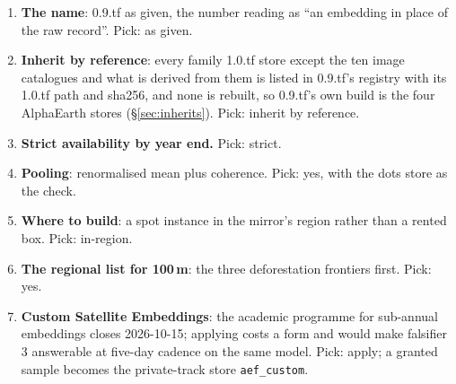 \documentclass[10pt]{article}
\newcommand{\code}[1]{\texttt{#1}}
\begin{document}
\begin{enumerate}\itemsep2pt
\item \textbf{The name}: 0.9.tf as given, the number reading as ``an
embedding in place of the raw record''. Pick: as given.
\item \textbf{Inherit by reference}: every family 1.0.tf store except the
ten image catalogues and what is derived from them is listed in 0.9.tf's
registry with its 1.0.tf path and sha256, and none is rebuilt, so 0.9.tf's
own build is the four AlphaEarth stores (\S\ref{sec:inherits}). Pick:
inherit by reference.
\item \textbf{Strict availability by year end.} Pick: strict.
\item \textbf{Pooling}: renormalised mean plus coherence. Pick: yes, with
the dots store as the check.
\item \textbf{Where to build}: a spot instance in the mirror's region
rather than a rented box. Pick: in-region.
\item \textbf{The regional list for 100\,m}: the three deforestation
frontiers first. Pick: yes.
\item \textbf{Custom Satellite Embeddings}: the academic programme for
sub-annual embeddings closes 2026-10-15; applying costs a form and would
make falsifier 3 answerable at five-day cadence on the same model. Pick:
apply; a granted sample becomes the private-track store \code{aef\_custom}.
\end{enumerate}
\end{document}
